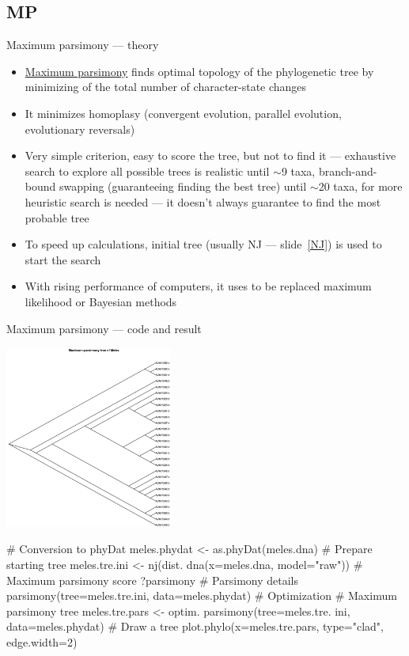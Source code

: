 \documentclass[compress, ucs, xelatex, 11pt, xcolor=svgnames,
	hyperref={
		bookmarks=true,
		unicode=true,
		colorlinks=true,
		pdftitle={Molecular data in R},
		plainpages=false,
		pdfauthor={Vojtech Zeisek},
		pdfsubject={Course about phylogeny and evolution in R},
		pdfcreator={XeLaTeX},
		pdfkeywords={R, evolution, phylogeny, molecular data},
		linkcolor=Tomato,
		anchorcolor=SaddleBrown,
		citecolor=Goldenrod,
		filecolor=DarkMagenta,
		menucolor=Sienna,
		urlcolor=DarkTurquoise,
		pdftex},
	url={hyphens, lowtilde} %
	]{beamer}
\begin{document}
\subsection{MP}

\begin{frame}{Maximum parsimony --- theory}
	\label{MP}
	\begin{itemize}
		\item \href{https://en.wikipedia.org/wiki/Maximum_parsimony_(phylogenetics)}{Maximum parsimony} finds optimal topology of the phylogenetic tree by minimizing of the total number of character-state changes
		\item It minimizes homoplasy (convergent evolution, parallel evolution, evolutionary reversals)
		\item Very simple criterion, easy to score the tree, but not to find it --- exhaustive search to explore all possible trees is realistic until $\sim$9 taxa, branch-and-bound swapping (guaranteeing finding the best tree) until $\sim$20 taxa, for more heuristic search is needed --- it doesn't always guarantee to find the most probable tree
		\item To speed up calculations, initial tree (usually NJ --- slide~\ref{NJ}) is used to start the search
		\item With rising performance of computers, it uses to be replaced maximum likelihood or Bayesian methods
	\end{itemize}
\end{frame}

\begin{frame}[fragile]{Maximum parsimony --- code and result}
	\begin{multicols}{2}
		\vfil
		\includegraphics[height=6cm]{parsimony.png}
		\vfil
		\begin{spluscode}
    # Conversion to phyDat
    meles.phydat <-
      as.phyDat(meles.dna)
    # Prepare starting tree
    meles.tre.ini <- nj(dist.
      dna(x=meles.dna, model="raw"))
    # Maximum parsimony score
    ?parsimony # Parsimony details
    parsimony(tree=meles.tre.ini,
      data=meles.phydat)
    # Optimization
    # Maximum parsimony tree
    meles.tre.pars <- optim.
      parsimony(tree=meles.tre.
      ini, data=meles.phydat)
    # Draw a tree
    plot.phylo(x=meles.tre.pars,
      type="clad", edge.width=2)
		\end{spluscode}
	\end{multicols}
\end{frame}
\end{document}
